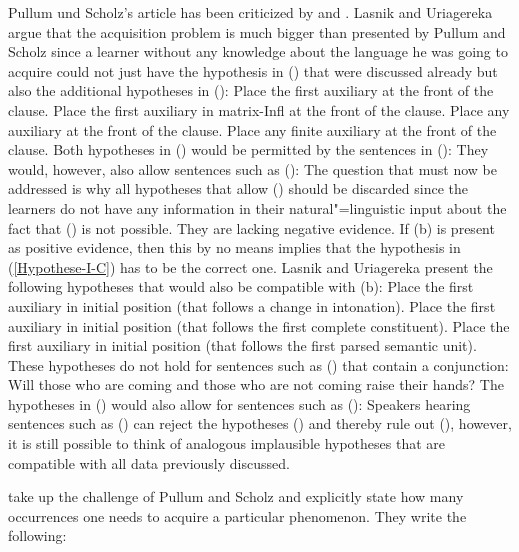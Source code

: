 Pullum und Scholz's article has been criticized by \citet{LU2002a} and \citet{LY2002a}. Lasnik and Uriagereka argue that the acquisition
problem is much bigger than presented by Pullum and Scholz since a learner without any knowledge about the language he was going to acquire
could not just have the hypothesis in () that were discussed already but also the additional hypotheses in ():
\eal
\label{Hilfsverbhypothesen}
\ex Place the first auxiliary at the front of the clause.
\ex\label{Hypothese-I-C} 
Place the first auxiliary in matrix-Infl at the front of the clause.
\zl
\eal
\ex Place any auxiliary at the front of the clause.
\ex Place any finite auxiliary at the front of the clause.
\zl
\addlines[2]
Both hypotheses in () would be permitted by the sentences in ():
\eal
{}
\zl
They would, however, also allow sentences such as  ():
\z
The question that must now be addressed is why all hypotheses that allow () should be discarded since the learners do
not have any information in their natural"=linguistic input about the fact that () is not possible. They are lacking
negative evidence. If (b) is present as positive evidence, then this by no means implies
that the hypothesis in (\ref{Hypothese-I-C}) has to be the correct one. Lasnik and Uriagereka present the following hypotheses
that would also be compatible with (b):
\eal
\ex Place the first auxiliary in initial position (that follows a change in intonation).
\ex Place the first auxiliary in initial position (that follows the first complete constituent).
\ex Place the first auxiliary in initial position (that follows the first parsed semantic unit).
\zl
These hypotheses do not hold for sentences such as () that contain a conjunction:
\ea
\label{Beispiel-Hilfsverbvoranstellung-Koordination}
Will those who are coming and those who are not coming raise their hands?
\z
The hypotheses in () would also allow for sentences such as ():
\z
Speakers hearing sentences such as () can reject the hypotheses () and thereby rule out (), however, it is still possible
to think of analogous implausible hypotheses that are compatible with all data previously discussed.

\citet{LY2002a} take up the challenge of Pullum and Scholz and explicitly state how many occurrences one needs to acquire a particular phenomenon.
They write the following:

